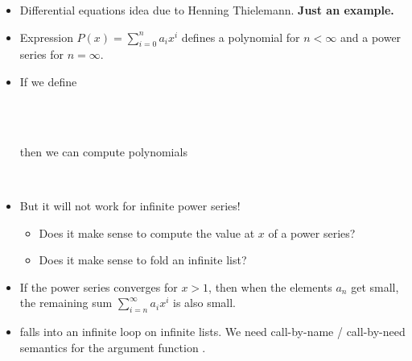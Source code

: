 \documentclass{beamer}
\newcommand{\tmstrong}[1]{\textbf{#1}}
\newcommand{\tmverbatim}[1]{\text{{\ttfamily{#1}}}}
\begin{document}
\begin{itemize}
  \item Differential equations idea due to Henning Thielemann.
  {\small{{\tmstrong{Just an example.}}}}
  
  \item Expression $P (x) = \sum_{i = 0}^n a_i x^i$ defines a polynomial for
  $n < \infty$ and a power series for $n = \infty$.
  
  \item If we define
  
  {}{}{\hlopt{=}}{\hlendline{}}\\
  {\hlstd{ \ }}{}{}{}{\hlendline{}}\\
  {\hlstd{ \ \ \ }}{\hlopt{\textbar }}{}{\hlopt{->
  }}{}{\hlopt{\textbar }}{}{\hlopt{(}}{}{\hlopt{,
  }}{}{}{\hlopt{) -> }}{}{\hlopt{(}}{}{\hlopt{)}}{\hlendline{}}
  
  then we can compute polynomials
  
  {}{}{\hlopt{=}}{\hlendline{}}\\
  {}{\hlopt{(}}{}{}{\hlopt{-> }}{}{}{}{}{}{\hlopt{) }}{}{}{}{\hlendline{}}
  
  \item But it will not work for infinite power series!
  \begin{itemize}
    \item Does it make sense to compute the value at $x$ of a power series?
    
    \item Does it make sense to fold an infinite list?
  \end{itemize}
  \item If the power series converges for $x > 1$, then when the elements
  $a_n$ get small, the remaining sum $\sum_{i = n}^{\infty} a_i x^i$ is also
  small.
  
  \item \tmverbatim{lfold\_right} falls into an infinite loop on infinite
  lists. We need call-by-name / call-by-need semantics for the argument
  function \tmverbatim{f}.
  

\end{itemize}
\end{document}
